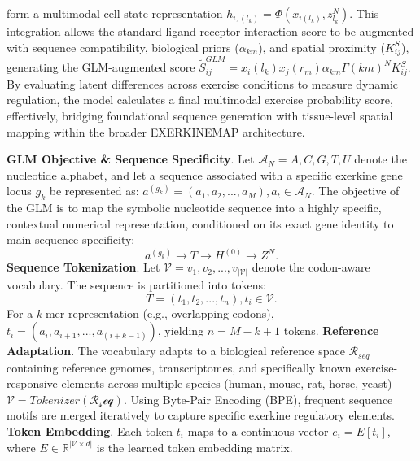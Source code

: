 \documentclass[11pt]{article}
\begin{document}
form a multimodal cell-state representation $h_{i,(l_k)} = \Phi(x_{i(l_k)},z_{l_k}^N)$. This integration allows the standard ligand-receptor interaction score to be augmented with sequence compatibility, biological priors ($\alpha_{km}$), and spatial proximity ($K_{ij}^S$), generating the GLM-augmented score $\widetilde{S}_{ij}^{GLM} = x_i(l_k)x_j(r_m)\alpha_{km}\Gamma(km)^NK_{ij}^S$. By evaluating latent differences across exercise conditions to measure dynamic regulation, the model calculates a final multimodal exercise probability score, effectively, bridging foundational sequence generation with tissue-level spatial mapping within the broader EXERKINEMAP architecture. 

\textbf{GLM Objective \& Sequence Specificity}. Let $\mathcal{A}_N = {A,C,G,T,U}$ denote the nucleotide alphabet, and let a sequence associated with a specific exerkine gene locus $g_k$ be represented as: $a^{(g_k)} = (a_1,a_2,...,a_M), a_t \in \mathcal{A}_N$. The objective of the GLM is to map the symbolic nucleotide sequence into a highly specific, contextual numerical representation, conditioned on its exact gene identity to main sequence specificity: \newline 
\begin{equation}
a^{(g_k)} \rightarrow T \rightarrow H^{(0)} \rightarrow Z^N. 
\end{equation}
\textbf{Sequence Tokenization}. Let $\mathcal{V} = {v_1,v_2,...,v_{|\mathcal{V}|}}$ denote the codon-aware vocabulary. The sequence is partitioned into tokens: \newline 
\begin{equation}
T = (t_1,t_2,...,t_n), t_i \in \mathcal{V}. 
\end{equation}
For a \textit{k}-mer representation (e.g., overlapping codons), $t_i = (a_i,a_{i+1},...,a_{(i+k-1)})$, yielding $n = M - k + 1$ tokens. \newline
\textbf{Reference Adaptation}. The vocabulary adapts to a biological reference space $\mathcal{R}_{seq}$ containing reference genomes, transcriptomes, and specifically known exercise-responsive elements across multiple species (human, mouse, rat, horse, yeast) $\mathcal{V}=Tokenizer(\mathcal{R_seq})$. Using Byte-Pair Encoding (BPE), frequent sequence motifs are merged iteratively to capture specific exerkine regulatory elements. \newline
\textbf{Token Embedding}. Each token $t_i$ maps to a continuous vector $e_i = E[t_i]$, where $E \in \mathbb{R}^{|\mathcal{V} \times d|}$ is the learned token embedding matrix. \newline
\end{document}
